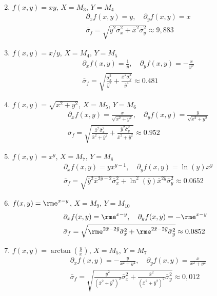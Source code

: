 \documentclass[11pt,answers]{exam}
\begin{document}
\begin{questions}
\begin{solution}
\begin{enumerate}
\begin{align*}
\end{align*}
\item $f(x,y)=xy$, $X=M_3$, $Y=M_4$
\begin{align*}
&
\partial_xf(x,y)=y
,\quad
\partial_yf(x,y)=x
\\
&
\bar \sigma_{f}=\sqrt{\bar{y}^2\bar\sigma_x^2+\bar{x}^2\bar\sigma_y^2}\approx 9,883
\end{align*}
\item $f(x,y)=x/y$, $X=M_4$, $Y=M_5$
\begin{align*}
	&
	\partial_xf(x,y)=\frac{1}{y}
	,\quad
	\partial_yf(x,y)=-\frac{x}{y^2}
	\\
	&
	\bar \sigma_{f}=\sqrt{\frac{\bar\sigma_x^2}{\bar y^2}+\frac{\bar x^2\bar\sigma_y^2}{\bar y^4}}\approx 0.481
\end{align*}
\item $f(x,y)=\sqrt{x^2+y^2}$, $X=M_5$, $Y=M_6$
\begin{align*}
	&
	\partial_xf(x,y)=\frac{x}{\sqrt{x^2+y^2}}
	,\quad
	\partial_yf(x,y)=\frac{y}{\sqrt{x^2+y^2}}
	\\
	&
	\bar \sigma_{f}=\sqrt{\frac{\bar x^2\bar\sigma_x^2}{\bar x^2+\bar y^2}+\frac{\bar y^2\bar\sigma_y^2}{\bar x^2+\bar y^2}}\approx 0.952
\end{align*}
\item $f(x,y)=x^y$, $X=M_7$, $Y=M_8$
\begin{align*}
	&
	\partial_xf(x,y)=yx^{y-1}
	,\quad
	\partial_yf(x,y)=\ln(y)x^y
	\\
	&
	\bar \sigma_{f}=\sqrt{\bar y^2\bar x^{2\bar y-2}\bar\sigma_x^2+\ln^2(\bar y)\bar x^{2\bar y}\bar\sigma_y^2}\approx 0.0652
\end{align*}
\item $f(x,y)=\rme^{x-y}$, $X=M_9$, $Y=M_{10}$
\begin{align*}
	&
	\partial_xf(x,y)=\rme^{x-y}
	,\quad
	\partial_yf(x,y)=-\rme^{x-y}
	\\
	&
	\bar \sigma_{f}=\sqrt{\rme^{2\bar x-2\bar y}\bar\sigma_x^2+\rme^{2\bar x-2\bar y}\bar\sigma_y^2}\approx 0.0852
\end{align*}
\item $f(x,y)=\arctan\left(\frac{y}{x}\right)$, $X=M_5$, $Y=M_7$
\begin{align*}
&
\partial_xf(x,y)=-\frac{y}{x^2+y^2}
,\quad
\partial_yf(x,y)=\frac{x}{x^2+y^2}
\\
&
\bar \sigma_{f}=\sqrt{\frac{\bar y^2}{(\bar x^2+\bar y^2)^2}\bar\sigma_x^2
+\frac{\bar x^2}{(\bar x^2+\bar y^2)^2}\bar\sigma_y^2}\approx 0,012

\end{align*}
\end{enumerate}
\end{solution}
\end{questions}
\end{document}
